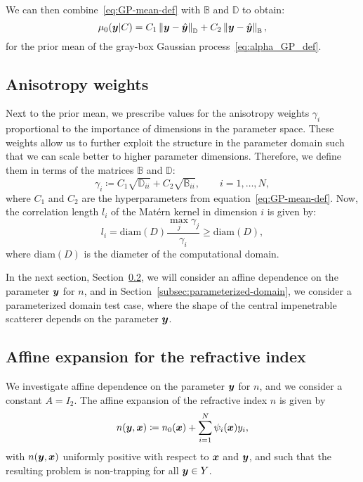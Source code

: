 We can then combine~\eqref{eq:GP-mean-def} with $\mathbb{B}$ and $\mathbb{D}$ to obtain:
\begin{equation}
    \mu_0({\bm{y}}|C)= C_1 \left\| {\bm{y}}-\hat{\bm{y}} \right\|_{\mathbb{D}}+C_2  \left\| {\bm{y}}-\hat{\bm{y}} \right\|_{\mathbb{B}}\label{eq:GP-mean-def_y},
\end{equation}
for the prior mean of the gray-box Gaussian process~\eqref{eq:alpha_GP_def}.

\subsection{Anisotropy weights}\label{subsec:importance-weights}
Next to the prior mean, we prescribe values for the anisotropy weights $\gamma_i$ proportional to the importance of dimensions in the parameter space.
These weights allow us to further exploit the structure in the parameter domain such that we can scale better to higher parameter dimensions.
Therefore, we define them in terms of the matrices $\mathbb{B}$ and $\mathbb{D}$:
\begin{equation*}
    \gamma_i \coloneqq C_1\sqrt{\mathbb{D}_{ii}}+C_2\sqrt{\mathbb{B}_{ii}}, \qquad i = 1,\ldots, N,
\end{equation*}
where $C_1$ and $C_2$ are the hyperparameters from equation~\eqref{eq:GP-mean-def}.
Now, the correlation length $l_i$ of the Matérn kernel in dimension $i$ is given by:
\begin{equation*}
    l_i = \text{diam}(D) \frac{\max_j \gamma_j}{\gamma_i} \geq \text{diam}(D),
\end{equation*}
where $\text{diam}(D)$ is the diameter of the computational domain.

In the next section, Section~\ref{subsec:disjoint-density}, we will consider an affine dependence on the parameter ${\bm{y}}$ for $n$, and in Section~\ref{subsec:parameterized-domain}, we consider a parameterized domain test case, where the shape of the central impenetrable scatterer depends on the parameter ${\bm{y}}$.

\subsection{Affine expansion for the refractive index}\label{subsec:disjoint-density}
We investigate affine dependence on the parameter ${\bm{y}}$ for $n$, and we consider a constant $A=I_2$.
The affine expansion of the refractive index $n$ is given by
\begin{equation}
    n({\bm{y}},{{\bm{x}}}) \coloneqq n_{0}({{\bm{x}}}) + \sum_{i=1}^{N} \psi_i({{\bm{x}}}) y_i, \label{eq:affinendef}
\end{equation}
with $n({\bm{y}}, {{\bm{x}}})$ uniformly positive with respect to ${{\bm{x}}}$ and ${\bm{y}}$, and such that the resulting problem is non-trapping for all ${\bm{y}}\in Y$.

